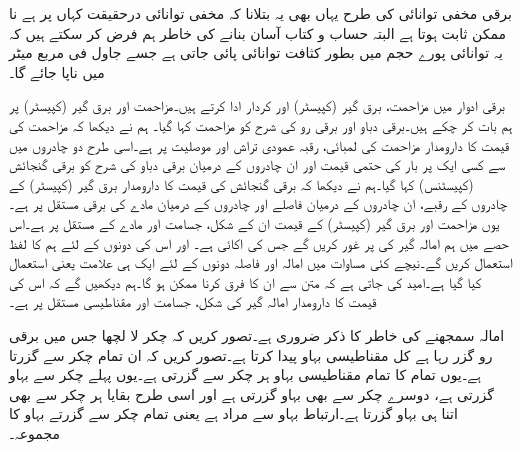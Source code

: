 برقی مخفی توانائی کی طرح یہاں بھی یہ بتلانا کہ مخفی توانائی درحقیقت کہاں پر ہے نا ممکن ثابت ہوتا ہے البتہ حساب و کتاب آسان بنانے کی خاطر ہم فرض کر سکتے ہیں کہ یہ توانائی پورے حجم میں بطور کثافت توانائی  پائی جاتی ہے جسے جاول فی مربع میٹر  میں ناپا جائے گا۔


برقی ادوار میں مزاحمت، برق گیر (کپیسٹر) اور  کردار ادا کرتے ہیں۔مزاحمت اور برق گیر (کپیسٹر) پر ہم بات کر چکے ہیں۔برقی دباو اور برقی رو کی شرح کو مزاحمت کہا گیا۔ ہم نے دیکھا کہ مزاحمت کی قیمت کا دارومدار مزاحمت کی لمبائی، رقبہ عمودی تراش اور موصلیت پر ہے۔اسی طرح دو چادروں میں سے کسی ایک پر بار کی حتمی قیمت اور ان چادروں  کے درمیان برقی دباو کی شرح کو برقی گنجائش (کپیسٹنس) کہا گیا۔ہم نے دیکھا کہ برقی گنجائش کی قیمت کا دارومدار برق گیر (کپیسٹر) کے چادروں کے رقبے، ان چادروں کے درمیان فاصلے اور چادروں کے درمیان مادے کی برقی مستقل پر ہے۔یوں مزاحمت اور برق گیر (کپیسٹر) کے قیمت ان کے شکل، جسامت اور مادے کے مستقل پر ہے۔اس حصے میں ہم امالہ گیر کی   پر غور کریں گے جس کی اکائی   ہے۔ اور اس کی  دونوں کے لئے ہم  کا لفظ استعمال کریں گے۔نیچے کئی مساوات میں امالہ اور فاصلہ دونوں کے لئے ایک ہی علامت یعنی  استعمال کیا گیا ہے۔امید کی جاتی ہے کہ متن سے ان کا فرق کرنا ممکن ہو گا۔ہم دیکھیں گے کہ اس کی قیمت کا دارومدار امالہ گیر کی شکل، جسامت اور مقناطیسی مستقل پر ہے۔ 

امالہ سمجھنے کی خاطر  کا ذکر ضروری ہے۔تصور کریں کہ  چکر لا لچھا جس میں  برقی رو گزر رہا ہے کل  مقناطیسی بہاو پیدا کرتا ہے۔تصور کریں کہ  ان تمام  چکر سے گزرتا ہے۔یوں تمام کا تمام مقناطیسی بہاو ہر چکر سے گزرتی ہے۔یوں پہلے چکر سے  بہاو گزرتی ہے، دوسرے چکر سے بھی  بہاو گزرتی ہے اور اسی طرح بقایا ہر چکر سے بھی اتنا ہی بہاو گزرتا ہے۔ارتباط بہاو سے مراد  ہے یعنی تمام چکر سے گزرتے بہاو کا مجموعہ۔

